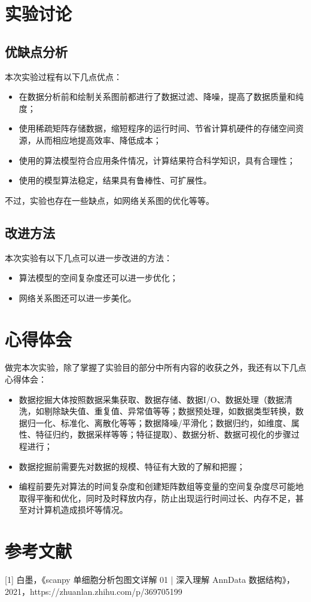 \documentclass {article}
\begin{document}
\section{实验讨论}
	\subsection{优缺点分析}
		本次实验过程有以下几点优点：
		\begin{itemize}
			\item 在数据分析前和绘制关系图前都进行了数据过滤、降噪，提高了数据质量和纯度；
			\item 使用稀疏矩阵存储数据，缩短程序的运行时间、节省计算机硬件的存储空间资源，从而相应地提高效率、降低成本；
			\item 使用的算法模型符合应用条件情况，计算结果符合科学知识，具有合理性；
			\item 使用的模型算法稳定，结果具有鲁棒性、可扩展性。
		\end{itemize}
		
		不过，实验也存在一些缺点，如网络关系图的优化等等。
		
	\subsection{改进方法}
		本次实验有以下几点可以进一步改进的方法：
		\begin{itemize}
			\item 算法模型的空间复杂度还可以进一步优化；
			\item 网络关系图还可以进一步美化。
		\end{itemize}
		
\section{心得体会}
	做完本次实验，除了掌握了实验目的部分中所有内容的收获之外，我还有以下几点心得体会：
	\begin{itemize}
		\item 数据挖掘大体按照数据采集获取、数据存储、数据I/O、数据处理（数据清洗，如剔除缺失值、重复值、异常值等等；数据预处理，如数据类型转换，数据归一化、标准化、离散化等等；数据降噪/平滑化；数据归约，如维度、属性、特征归约，数据采样等等；特征提取）、数据分析、数据可视化的步骤过程进行；
		\item 数据挖掘前需要先对数据的规模、特征有大致的了解和把握；
		\item 编程前要先对算法的时间复杂度和创建矩阵数组等变量的空间复杂度尽可能地取得平衡和优化，同时及时释放内存，防止出现运行时间过长、内存不足，甚至对计算机造成损坏等情况。
	\end{itemize}

\section{参考文献}
	[1] 白墨，《scanpy 单细胞分析包图文详解 01 | 深入理解 AnnData 数据结构》，2021，https://zhuanlan.zhihu.com/p/369705199

\end{document}
